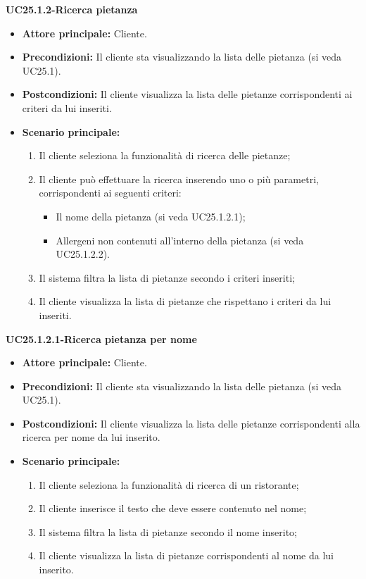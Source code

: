 \textbf{UC25.1.2-Ricerca pietanza}
\begin{itemize}
\item \textbf{Attore principale:} Cliente.
\item \textbf{Precondizioni:}  Il cliente sta visualizzando la lista delle pietanza (si veda UC25.1).
\item \textbf{Postcondizioni:} Il cliente visualizza la lista delle pietanze corrispondenti ai criteri da lui inseriti.
\item \textbf{Scenario principale:}
\begin{enumerate}
    \item Il cliente seleziona la funzionalità di ricerca delle pietanze;
    \item Il cliente può effettuare la ricerca inserendo uno o più parametri, corrispondenti ai seguenti criteri:
    \begin{itemize}
        \item Il nome della pietanza (si veda UC25.1.2.1);
        \item Allergeni non contenuti all'interno della pietanza (si veda UC25.1.2.2).
    \end{itemize}
    \item Il sistema filtra la lista di pietanze secondo i criteri inseriti;
    \item Il cliente visualizza la lista di pietanze che rispettano i criteri da lui inseriti.
\end{enumerate}
\end{itemize}

\textbf{UC25.1.2.1-Ricerca pietanza per nome}
\begin{itemize}
\item \textbf{Attore principale:} Cliente.
\item \textbf{Precondizioni:}  Il cliente sta visualizzando la lista delle pietanza (si veda UC25.1).
\item \textbf{Postcondizioni:} Il cliente visualizza la lista delle pietanze corrispondenti alla ricerca per nome da lui inserito.
\item \textbf{Scenario principale:}
\begin{enumerate}
    \item Il cliente seleziona la funzionalità di ricerca di un ristorante;
    \item Il cliente inserisce il testo che deve essere contenuto nel nome;
    \item Il sistema filtra la lista di pietanze secondo il nome inserito;
    \item Il cliente visualizza la lista di pietanze corrispondenti al nome da lui inserito.
\end{enumerate}
\end{itemize}

